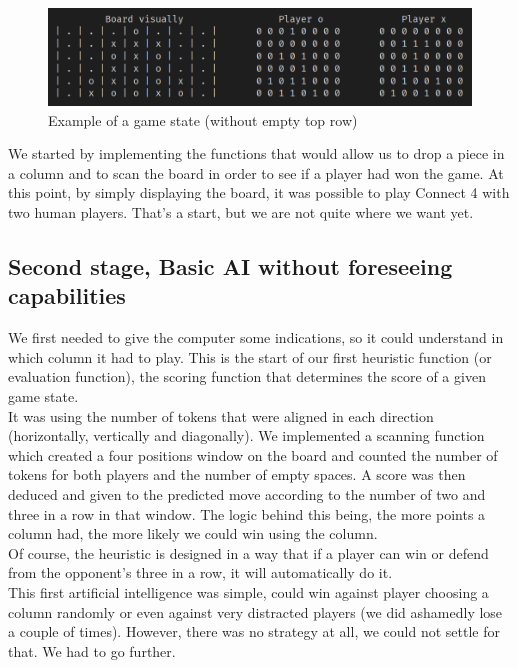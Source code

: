 \documentclass[11pt, a4paper, oneside]{report}
\begin{document}
	\begin{figure}[ht]
		\includegraphics[scale=0.4]{example.png}
		\centering
		\caption{Example of a game state (without empty top row)}\label{fig:example_game_state}
	\end{figure}

	We started by implementing the functions that would allow us to drop a piece in a column and to scan the board in order to see if a player had won the game. At this point, by simply displaying the board, it was possible to play Connect 4 with two human players. That’s a start, but we are not quite where we want yet. \\

	\subsection{Second stage, Basic AI without foreseeing capabilities}

	We first needed to give the computer some indications, so it could understand in which column it had to play. This is the start of our first heuristic function (or evaluation function), the scoring function that determines the score of a given game state. \\
	It was using the number of tokens that were aligned in each direction (horizontally, vertically and diagonally). We implemented a scanning function which created a four positions window on the board and counted the number of tokens for both players and the number of empty spaces. A score was then deduced and given to the predicted move according to the number of two and three in a row in that window. The logic behind this being, the more points a column had, the more likely we could win using the column. \\
	Of course, the heuristic is designed in a way that if a player can win or defend from the opponent’s three in a row, it will automatically do it. \\

	This first artificial intelligence was simple, could win against player choosing a column randomly or even against very distracted players (we did ashamedly lose a couple of times). However, there was no strategy at all, we could not settle for that. We had to go further. \\
\end{document}
